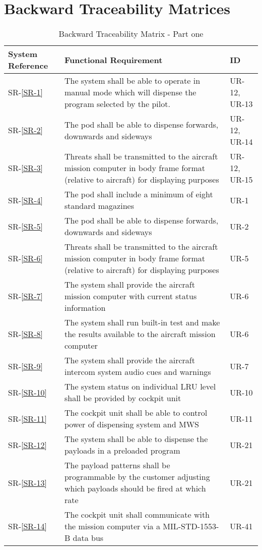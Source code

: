 \documentclass[Main]{subfiles}
\begin{document}
\section{Backward Traceability Matrices}

\begin{table}[htbp]
	\centering
	\begin{tabular}{p{1.8cm} p{11cm} l} \hline
	System Reference & Functional Requirement & ID\\\hline
	SR-\ref{SR-1} &  The system shall be able to operate in manual mode which will dispense the program selected by the pilot. & UR-12, UR-13 \\
	SR-\ref{SR-2} & The pod shall be able to dispense forwards, downwards and sideways & UR-12, UR-14 \\
	SR-\ref{SR-3} & Threats shall be transmitted to the aircraft mission computer in body frame format (relative to aircraft) for displaying purposes & UR-12, UR-15 \\
	SR-\ref{SR-4} & The pod shall include a minimum of eight standard magazines & UR-1 \\
	SR-\ref{SR-5} & The pod shall be able to dispense forwards, downwards and sideways & UR-2 \\
	SR-\ref{SR-6} & Threats shall be transmitted to the aircraft mission computer in body frame format
	(relative to aircraft) for displaying purposes & UR-5 \\
	SR-\ref{SR-7} & The system shall provide the aircraft mission computer with current status information & UR-6 \\
	SR-\ref{SR-8} &  The system shall run built-in test and make the results available to the aircraft mission
	computer & UR-6 \\
	SR-\ref{SR-9} & The system shall provide the aircraft intercom system audio cues and warnings & UR-7 \\
	SR-\ref{SR-10} &  The system status on individual LRU level shall be provided by cockpit unit & UR-10 \\
	SR-\ref{SR-11} & The cockpit unit shall be able to control power of dispensing system and MWS & UR-11 \\
	SR-\ref{SR-12} & The system shall be able to dispense the payloads in a preloaded program & UR-21 \\
	SR-\ref{SR-13} & The payload patterns shall be programmable by the customer adjusting which payloads
	should be fired at which rate & UR-21 \\
	SR-\ref{SR-14} & The cockpit unit shall communicate with the mission computer via a MIL-STD-1553-B
	data bus & UR-41 \\\hline
	\end{tabular}
\caption{Backward Traceability Matrix - Part one}
\label{Tab:BackwardPartOne}
\end{table}
\end{document}
